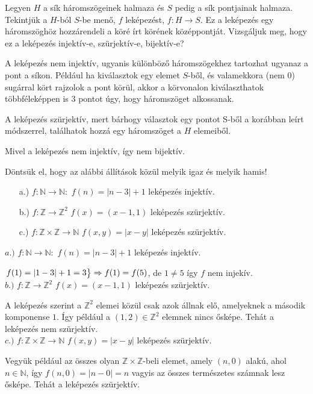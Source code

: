 \begin{problem}
	Legyen $H$ a sík háromszögeinek halmaza és $S$ pedig a sík pontjainak
	halmaza. Tekintjük a $H$-ból $S$-be menő, $f$ leképezést, $f:H\rightarrow S$.
	Ez a leképezés egy háromszöghöz hozzárendeli a köré írt körének középpontját.
	Vizsgáljuk meg, hogy ez a leképezés injektív-e, szürjektív-e, bijektív-e? 
\end{problem}
\begin{solution}
	A leképezés nem injektív, ugyanis különböző háromszögekhez tartozhat
	ugyanaz a pont a síkon. Például ha kiválasztok egy elemet $S$-ből,
	és valamekkora (nem 0) sugárral kört rajzolok a pont körül, akkor
	a körvonalon kiválaszthatok többféleképpen is 3 pontot úgy, hogy háromszöget
	alkossanak.
	
	A leképezés szürjektív, mert bárhogy választok egy pontot S-ből a
	korábban leírt módszerrel, találhatok hozzá egy háromszöget a $H$
	elemeiből.
	
	Mivel a leképezés nem injektív, így nem bijektív.
\end{solution}
\begin{problem}
	Döntsük el, hogy az alábbi állítások közül melyik igaz és melyik hamis! 
	\begin{enumerate}
		\item[a.)] $f:\mathbb{N}\rightarrow\mathbb{N}:$ $f(n)=|n-3|+1$ leképezés injektív. 
		\item[b.)] $f:\mathbb{Z}\rightarrow\mathbb{Z}^{2}$ $f(x)=(x-1,1)$ leképezés
		szürjektív. 
		\item[c.)] $f:\mathbb{Z}\times\mathbb{Z}\rightarrow\mathbb{N}$ $f(x,y)=|x-y|$
		leképezés szürjektív. 
	\end{enumerate}
\end{problem}
\begin{solution}
	$a.)$ $f:\mathbb{N}\rightarrow\mathbb{N}:$ $f(n)=|n-3|+1$ leképezés
	injektív.
	
	$\begin{rcases}f(1)=|1-3|+1=3\end{rcases}\Rightarrow f(1)=f(5)$,
	de $1\neq5$ így $f$ nem injekív. \\
	$b.)$ $f:\mathbb{Z}\rightarrow\mathbb{Z}^{2}$ $f(x)=(x-1,1)$ leképezés
	szürjektív.
	
	A leképezés szerint a $\mathbb{Z}^{2}$ elemei közül csak azok állnak
	elő, amelyeknek a második komponense $1$. Így például a $(1,2)\in\mathbb{Z}^{2}$
	elemnek nincs ősképe. Tehát a leképezés nem szürjektív. \\
	$c.)$ $f:\mathbb{Z}\times\mathbb{Z}\rightarrow\mathbb{N}$ $f(x,y)=|x-y|$
	leképezés szürjektív.
	
	Vegyük például az összes olyan $\mathbb{Z\times Z}$-beli elemet,
	amely $(n,0)$ alakú, ahol $n\in\mathbb{N}$, így $f(n,0)=|n-0|=n$
	vagyis az összes természetes számnak lesz ősképe. Tehát a leképezés
	szürjektív. 
\end{solution}

